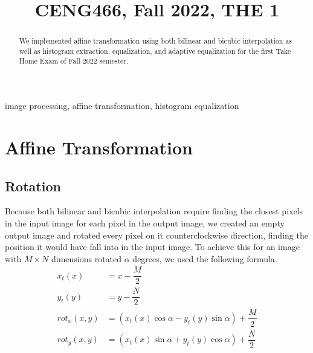 \documentclass[conference]{IEEEtran}
\begin{document}
\title{CENG466, Fall 2022, THE 1\\

}

\author{
\and
{}
}

\maketitle

\begin{abstract}
We implemented affine transformation using both bilinear and bicubic interpolation as well as histogram extraction, equalization, and adaptive equalization for the first Take Home Exam of Fall 2022 semester.
\end{abstract}

\begin{IEEEkeywords}
image processing, affine transformation, histogram equalization
\end{IEEEkeywords}

\section{Affine Transformation}

\subsection{Rotation}
Because both bilinear and bicubic interpolation require finding the closest pixels in the input image for each pixel in the output image, we created an empty output image and rotated every pixel on it counterclockwise direction, finding the position it would have fall into in the input image. To achieve this for an image with $M\times N$ dimensions rotated $\alpha$ degrees, we used the following formula.
\begin{align}
	x_t(x) &= x - \dfrac{M}{2}\\
	y_t(y) &= y - \dfrac{N}{2}\\
	\textit{rot}_x(x,y) &= (x_t(x)\cos \alpha - y_t(y) \sin \alpha ) + \dfrac{M}{2}\\
	\textit{rot}_y(x,y) &= (x_t(x)\sin \alpha + y_t(y) \cos \alpha ) + \dfrac{N}{2}
\end{align}
\end{document}

